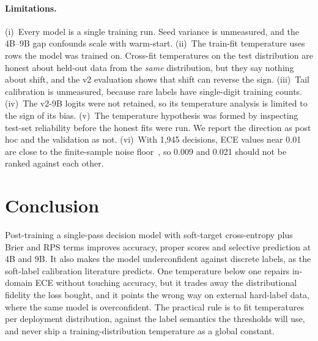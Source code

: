 \documentclass{article}
\begin{document}
\paragraph{Limitations.} (i)~Every model is a single training run. Seed
variance is unmeasured, and the 4B--9B gap confounds scale with
warm-start. (ii)~The train-fit temperature uses rows the model was trained
on. Cross-fit temperatures on the test distribution are honest about
held-out data from the \emph{same} distribution, but they say nothing
about shift, and the v2 evaluation shows that shift can reverse the sign.
(iii)~Tail calibration is unmeasured, because rare labels have single-digit
training counts. (iv)~The v2-9B logits were not retained, so its
temperature analysis is limited to the sign of its bias. (v)~The
temperature hypothesis was formed by inspecting test-set reliability
before the honest fits were run. We report the direction as post hoc and
the validation as not. (vi)~With 1,945 decisions, ECE values near 0.01 are
close to the finite-sample noise floor~\cite{sharma2026typedbench}, so
0.009 and 0.021 should not be ranked against each other.

\section{Conclusion}

Post-training a single-pass decision model with soft-target cross-entropy
plus Brier and RPS terms improves accuracy, proper scores and selective
prediction at 4B and 9B. It also makes the model underconfident against
discrete labels, as the soft-label calibration literature predicts. One
temperature below one repairs in-domain ECE without touching accuracy, but
it trades away the distributional fidelity the loss bought, and it points
the wrong way on external hard-label data, where the same model is
overconfident. The practical rule is to fit temperatures per deployment
distribution, against the label semantics the thresholds will use, and
never ship a training-distribution temperature as a global constant.



\end{document}
